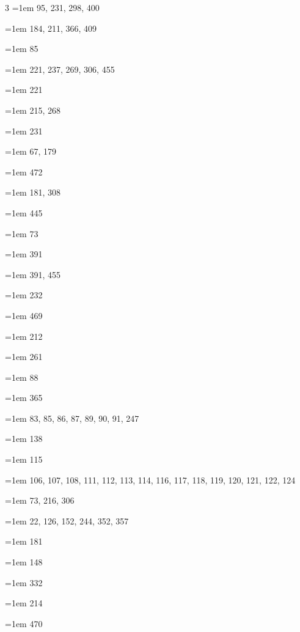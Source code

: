 \begin{multicols}{3}
\hangindent=1em  95, 231, 298, 400\par
\hangindent=1em  184, 211, 366, 409\par
\hangindent=1em  85\par
\hangindent=1em  221, 237, 269, 306, 455\par
\hangindent=1em  221\par
\hangindent=1em  215, 268\par
\hangindent=1em  231\par
\hangindent=1em  67, 179\par
\hangindent=1em  472\par
\hangindent=1em  181, 308\par
\hangindent=1em  445\par
\hangindent=1em  73\par
\hangindent=1em  391\par
\hangindent=1em  391, 455\par
\hangindent=1em  232\par
\hangindent=1em  469\par
\hangindent=1em  212\par
\hangindent=1em  261\par
\hangindent=1em  88\par
\hangindent=1em  365\par
\hangindent=1em  83, 85, 86, 87, 89, 90, 91, 247\par
\hangindent=1em  138\par
\hangindent=1em  115\par
\hangindent=1em  106, 107, 108, 111, 112, 113, 114, 116, 117, 118, 119, 120, 121, 122, 124\par
\hangindent=1em  73, 216, 306\par
\hangindent=1em  22, 126, 152, 244, 352, 357\par
\hangindent=1em  181\par
\hangindent=1em  148\par
\hangindent=1em  332\par
\hangindent=1em  214\par
\hangindent=1em  470\par

\end{multicols}
